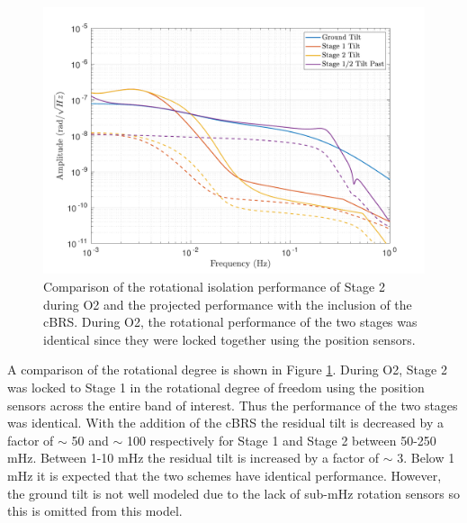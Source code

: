 \documentclass [12pt, proquest]{uwthesis}[2019]
\begin{document}
\begin{figure}[!h]
\begin{center}
\includegraphics[width=\textwidth]{cBRS_Model_CompRX.pdf}
\caption[Comparison of the rotational isolation performance of Stage 2 during O2 and the projected performance with the inclusion of the cBRS]{Comparison of the rotational isolation performance of Stage 2 during O2 and the projected performance with the inclusion of the cBRS. During O2, the rotational performance of the two stages was identical since they were locked together using the position sensors.}
\label{cBRSCompR}
\end{center}
\end{figure}

A comparison of the rotational degree is shown in Figure \ref{cBRSCompR}. During O2, Stage 2 was locked to Stage 1 in the rotational degree of freedom using the position sensors across the entire band of interest. Thus the performance of the two stages was identical. With the addition of the cBRS the residual tilt is decreased by a factor of $\sim$ 50 and $\sim$ 100 respectively for Stage 1 and Stage 2 between 50-250 mHz. Between 1-10 mHz the residual tilt is increased by a factor of $\sim$ 3. Below 1 mHz it is expected that the two schemes have identical performance. However, the ground tilt is not well modeled due to the lack of sub-mHz rotation sensors so this is omitted from this model.
\end{document}
